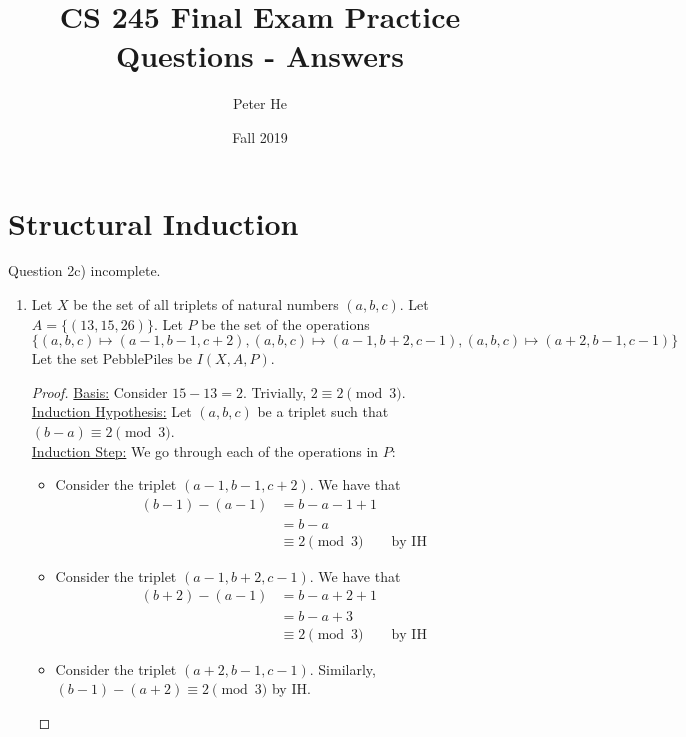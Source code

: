 \documentclass[12pt]{article}
\title{CS 245 Final Exam Practice Questions - Answers}
\author{Peter He}
\date{Fall 2019}
\begin{document}
    \maketitle

    \section{Structural Induction}

    Question 2c) incomplete.

    \begin{enumerate}
        \item 
        \begin{tasks}
            \task Let $X$ be the set of all triplets of natural numbers $(a,b,c)$. Let $A=\{(13,15,26)\}$. Let $P$ be the set of the operations \[\{(a,b,c)\mapsto (a-1,b-1,c+2),(a,b,c)\mapsto (a-1,b+2,c-1),(a,b,c)\mapsto (a+2,b-1,c-1)\}\] Let the set PebblePiles be $I(X,A,P)$.
            \task
                \begin{proof}
                    \underline{Basis:} Consider $15-13=2$. Trivially, $2\equiv 2\pmod{3}$.\\
                    \underline{Induction Hypothesis:} Let $(a,b,c)$ be a triplet such that $(b-a)\equiv 2\pmod{3}$.\\
                    \underline{Induction Step:} We go through each of the operations in $P$:
                    \begin{itemize}
                        \item Consider the triplet $(a-1,b-1,c+2)$. We have that
                        \begin{align*}
                            (b-1)-(a-1)&=b-a-1+1\\
                            &=b-a\\
                            &\equiv 2\pmod{3}\qquad\text{by IH}
                        \end{align*}
                        \item Consider the triplet $(a-1,b+2,c-1)$. We have that
                        \begin{align*}
                            (b+2)-(a-1)&=b-a+2+1\\
                            &=b-a+3\\
                            &\equiv 2\pmod{3}\qquad\text{by IH}
                        \end{align*}
                        \item Consider the triplet $(a+2,b-1,c-1)$. Similarly, $(b-1)-(a+2)\equiv 2\pmod{3}$ by IH.

\end{itemize}
\end{proof}
\end{tasks}
\end{enumerate}
\end{document}
